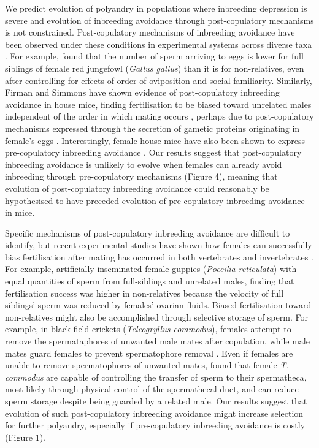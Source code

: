 \documentclass[10pt,letterpaper]{article}
\begin{document}
We predict evolution of polyandry in populations where inbreeding depression is severe and evolution of inbreeding avoidance through post-copulatory mechanisms is not constrained. Post-copulatory mechanisms of inbreeding avoidance have been observed under these conditions in experimental systems across diverse taxa \cite[e.g.,][]{Pizzari2004, Firman2008, Bretman2009, Gasparini2011, Tuni2013, Firman2015}. For example, \cite{Pizzari2004} found that the number of sperm arriving to eggs is lower for full siblings of female red jungefowl (\textit{Gallus gallus}) than it is for non-relatives, even after controlling for effects of order of oviposition and social familiarity. Similarly, Firman and Simmons \citeyearpar{Firman2008, Firman2015} have shown evidence of post-copulatory inbreeding avoidance in house mice, finding fertilisation to be biased toward unrelated males independent of the order in which mating occurs \cite[][]{Firman2008}, perhaps due to post-copulatory mechanisms expressed through the secretion of gametic proteins originating in female's eggs \cite[][]{Firman2015}. Interestingly, female house mice have also been shown to express pre-copulatory inbreeding avoidance  \cite[][]{Potts1991, Roberts2003}. Our results suggest that post-copulatory inbreeding avoidance is unlikely to evolve when females can already avoid inbreeding through pre-copulatory mechanisms (Figure 4), meaning that evolution of post-copulatory inbreeding avoidance could reasonably be hypothesised to have preceded evolution of pre-copulatory inbreeding avoidance in mice.  

Specific mechanisms of post-copulatory inbreeding avoidance are difficult to identify, but recent experimental studies have shown how females can successfully bias fertilisation after mating has occurred in both vertebrates \cite[e.g.,][]{Gasparini2011} and invertebrates \cite[e.g.,][]{Tuni2013}. For example, \cite{Gasparini2011} artificially inseminated female guppies (\textit{Poecilia reticulata}) with equal quantities of sperm from full-siblings and unrelated males, finding that fertilisation success was higher in non-relatives because the velocity of full siblings' sperm was reduced by females' ovarian fluids. Biased fertilisation toward non-relatives might also be accomplished through selective storage of sperm. For example, in black field crickets (\textit{Teleogryllus commodus}), females attempt to remove the spermataphores of unwanted male mates after copulation, while male mates guard females to prevent spermatophore removal \cite[][]{Bussiere2006}. Even if females are unable to remove spermatophores of unwanted mates, \cite{Tuni2013} found that female \textit{T. commodus} are capable of controlling the transfer of sperm to their spermatheca, most likely through physical control of the spermathecal duct, and can reduce sperm storage despite being guarded by a related male. Our results suggest that evolution of such post-copulatory inbreeding avoidance might increase selection for further polyandry, especially if pre-copulatory inbreeding avoidance is costly (Figure 1).
\end{document}
